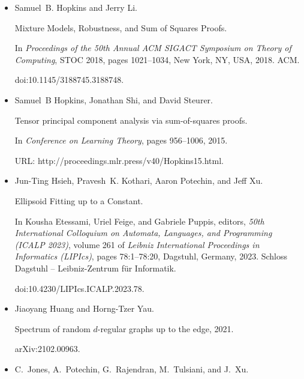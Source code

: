 \documentclass[10pt,a4paper]{article}
\begin{document}
\begin{itemize}
\item[] 
[20]

Samuel B. Hopkins and Jerry Li.


Mixture Models, Robustness, and Sum of Squares Proofs.


In \emph{Proceedings of the 50th Annual ACM SIGACT Symposium on Theory
of Computing}, STOC 2018, pages 1021–1034, New York, NY, USA, 2018. ACM.


doi:10.1145/3188745.3188748.





\item[] 
[21]

Samuel B Hopkins, Jonathan Shi, and David Steurer.


Tensor principal component analysis via sum-of-squares proofs.


In \emph{Conference on Learning Theory}, pages 956–1006, 2015.


URL: http://proceedings.mlr.press/v40/Hopkins15.html.





\item[] 
[22]

Jun-Ting Hsieh, Pravesh K. Kothari, Aaron Potechin, and Jeff Xu.


Ellipsoid Fitting up to a Constant.


In Kousha Etessami, Uriel Feige, and Gabriele Puppis, editors, \emph{50th International Colloquium on Automata, Languages, and Programming (ICALP
2023)}, volume 261 of \emph{Leibniz International Proceedings in Informatics
(LIPIcs)}, pages 78:1–78:20, Dagstuhl, Germany, 2023. Schloss Dagstuhl –
Leibniz-Zentrum für Informatik.


doi:10.4230/LIPIcs.ICALP.2023.78.





\item[] 
[23]

Jiaoyang Huang and Horng-Tzer Yau.


Spectrum of random $d$-regular graphs up to the edge, 2021.


arXiv:2102.00963.





\item[] 
[24]

C. Jones, A. Potechin, G. Rajendran, M. Tulsiani, and J. Xu.



\end{itemize}
\end{document}
